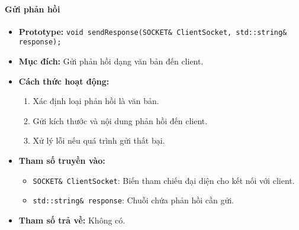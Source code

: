 \paragraph{\textbf{Gửi phản hồi}}
\begin{itemize}
    \item \textbf{Prototype:} \texttt{void sendResponse(SOCKET\& ClientSocket, std::string\& response);}
    
    \item \textbf{Mục đích:} Gửi phản hồi dạng văn bản đến client.
    
    \item \textbf{Cách thức hoạt động:} 
    \begin{enumerate}
        \item Xác định loại phản hồi là văn bản.
        \item Gửi kích thước và nội dung phản hồi đến client.
        \item Xử lý lỗi nếu quá trình gửi thất bại.
    \end{enumerate}
    
    \item \textbf{Tham số truyền vào:} 
    \begin{itemize}
        \item \texttt{SOCKET\& ClientSocket}: Biến tham chiếu đại diện cho kết nối với client.
        \item \texttt{std::string\& response}: Chuỗi chứa phản hồi cần gửi.
    \end{itemize}
    
    \item \textbf{Tham số trả về:} Không có.
\end{itemize}

